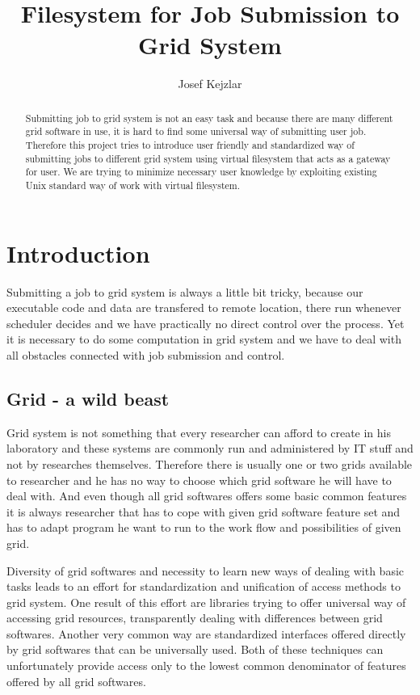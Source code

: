 \documentclass[a4paper,10pt,twocolumn]{article}
\title{Filesystem for Job Submission to Grid System}
\author{Josef Kejzlar}
\begin{document}
\maketitle

\begin{abstract}
Submitting job to grid system is not an easy task and because there are many different grid software in use, it is hard to find some universal way of submitting user job. Therefore this project tries to introduce user friendly and standardized way of submitting jobs to different grid system using virtual filesystem that acts as a gateway for user. We are trying to minimize necessary user knowledge by exploiting existing Unix standard way of work with virtual filesystem.
\end{abstract}



\section{Introduction}

Submitting a job to grid system is always a little bit tricky, because our executable code and data are transfered to remote location, there run whenever scheduler decides and we have practically no direct control over the process. Yet it is necessary to do some computation in grid system and we have to deal with all obstacles connected with job submission and control.

\subsection{Grid - a wild beast}
Grid system is not something that every researcher can afford to create in his laboratory and these systems are commonly run and administered by IT stuff and not by researches themselves. Therefore there is usually one or two grids available to researcher and he has no way to choose which grid software he will have to deal with. And even though all grid softwares offers some basic common features it is always researcher that has to cope with given grid software feature set and has to adapt program he want to run to the work flow and possibilities of given grid. 

Diversity of grid softwares and necessity to learn new ways of dealing with basic tasks leads to an effort for standardization and unification of access methods to grid system. One result of this effort are libraries trying to offer universal way of accessing grid resources, transparently dealing with differences between grid softwares. Another very common way are standardized interfaces offered directly by grid softwares that can be universally used. Both of these techniques can unfortunately provide access only to the lowest common denominator of features offered by all grid softwares.
\end{document}
